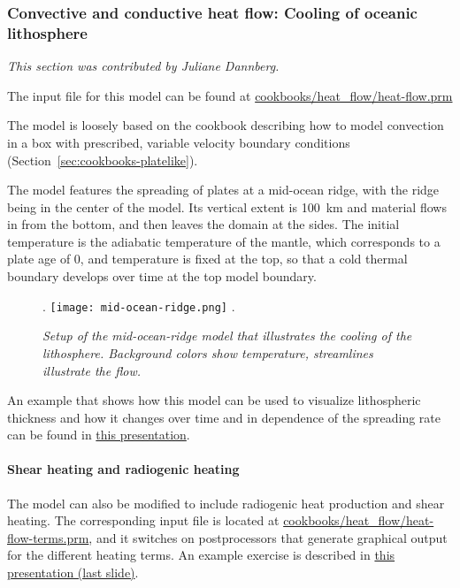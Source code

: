 \subsubsection{Convective and conductive heat flow: Cooling of oceanic lithosphere}
\label{sec:cookbooks-heat-flow}
\textit{This section was contributed by Juliane Dannberg.}

The input file for this model can be found at \url{cookbooks/heat_flow/heat-flow.prm}

The model is loosely based on the cookbook describing how to model convection in a box with prescribed, 
variable velocity boundary conditions (Section~\ref{sec:cookbooks-platelike}). 

The model features the spreading of plates at a mid-ocean ridge, with the ridge being in the center of the model. 
Its vertical extent is 100~km and material flows in from the bottom, and then leaves the domain at the sides. 
The initial temperature is the adiabatic temperature of the mantle, which corresponds to a plate age of 0, 
and temperature is fixed at the top, so that a cold thermal boundary develops over time at the top model boundary.

\begin{figure}
\phantom.
\hfill
\texttt{[image: mid-ocean-ridge.png]}
\hfill
\phantom.
\caption{\it Setup of the mid-ocean-ridge model that illustrates the cooling of the lithosphere.
  Background colors show temperature, streamlines illustrate the flow.}
\label{fig:convection-box-iterations}
\end{figure}

An example that shows how this model can be used to visualize lithospheric thickness and how it changes over time and 
in dependence of the spreading rate can be found in \href{https://www.dropbox.com/s/tdfj9pi2mdq0fhe/04_geophysics_lecture_01_13.pdf?dl=0}{this presentation}. 

\paragraph{Shear heating and radiogenic heating} 
The model can also be modified to include radiogenic heat production and shear heating. 
The corresponding input file is located at \url{cookbooks/heat_flow/heat-flow-terms.prm}, and it switches on 
postprocessors that generate graphical output for the different heating terms. 
An example exercise is described in \href{https://www.dropbox.com/s/jh2v6vgje4cft5n/05_geophysics_lecture_01_27.pdf?dl=0}{this presentation (last slide)}. 

